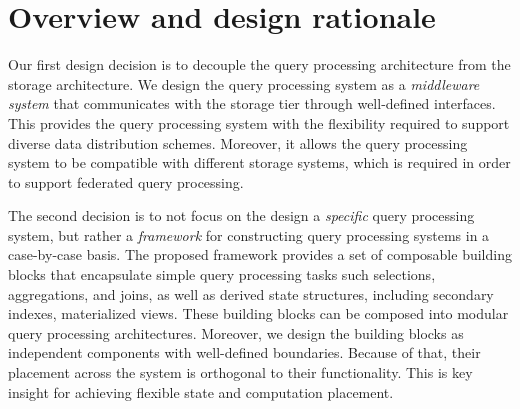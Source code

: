 
\section{Overview and design rationale}
\label{sec:design_rationale}
Our first design decision is to decouple the query processing architecture from the storage architecture.
We design the query processing system as a \textit{middleware system} that communicates with the storage tier through
well-defined interfaces.
This provides the query processing system with the flexibility required to support diverse data distribution schemes.
Moreover, it allows the query processing system to be compatible with different storage systems,
which is required in order to support federated query processing.

\medskip
\noindent
The second decision is to not focus on the design a \textit{specific} query processing system,
but rather a \textit{framework} for constructing query processing systems in a case-by-case basis.
The proposed framework provides a set of composable building blocks that encapsulate simple query processing tasks
such selections, aggregations, and joins, as well as derived state structures, including secondary indexes, materialized views.
These building blocks can be composed into modular query processing architectures.
Moreover, we design the building blocks as independent components with well-defined boundaries.
Because of that, their placement across the system is orthogonal to their functionality.
This is key insight for achieving flexible state and computation placement.




